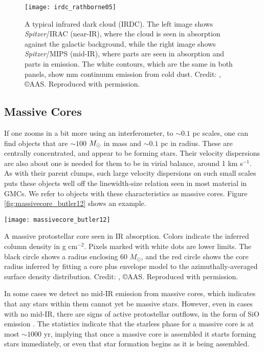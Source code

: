 \begin{figure}
\texttt{[image: irdc\_rathborne05]}
\caption[IR and mm images of an IRDC]{
\label{fig:irdc_rathborne05}
A typical infrared dark cloud (IRDC). The left image shows \textit{Spitzer}/IRAC (near-IR), where the cloud is seen in absorption against the galactic background, while the right image shows \textit{Spitzer}/MIPS (mid-IR), where parts are seen in absorption and parts in emission. The white contours, which are the same in both panels, show mm continuum emission from cold dust. Credit: \citet{rathborne06a}, \copyright AAS. Reproduced with permission.
}
\end{figure}


\subsection{Massive Cores}
\label{ssec:massivecores}

If one zooms in a bit more using an interferometer, to $\sim 0.1$ pc scales, one can find objects that are $\sim 100$ $M_{\odot}$ in mass and $\sim 0.1$ pc in radius. These are centrally concentrated, and appear to be forming stars. Their velocity dispersions are also about one is needed for them to be in virial balance, around 1 km s$^{-1}$. As with their parent clumps, such large velocity dispersions on such small scales puts these objects well off the linewidth-size relation seen in most material in GMCs. We refer to objects with these characteristics as massive cores. Figure \ref{fig:massivecore_butler12} shows an example.
\begin{marginfigure}
\texttt{[image: massivecore\_butler12]}
\caption[A massive core in IR absorption]{
\label{fig:massivecore_butler12}
A massive protostellar core seen in IR absorption. Colors indicate the inferred column density in g cm$^{-2}$. Pixels marked with white dots are lower limits. The black circle shows a radius enclosing $60$ $M_\odot$, and the red circle shows the core radius inferred by fitting a core plus envelope model to the azimuthally-averaged surface density distribution. Credit: \citet{butler12a}, \copyright AAS. Reproduced with permission.
}
\end{marginfigure}

In some cases we detect no mid-IR emission from massive cores, which indicates that any stars within them cannot yet be massive stars. However, even in cases with no mid-IR, there are signs of active protostellar outflows, in the form of SiO emission \citep[e.g.,][]{motte07a}. The statistics indicate that the starless phase for a massive core is at most $\sim 1000$ yr, implying that once a massive core is assembled it starts forming stars immediately, or even that star formation begins as it is being assembled.


